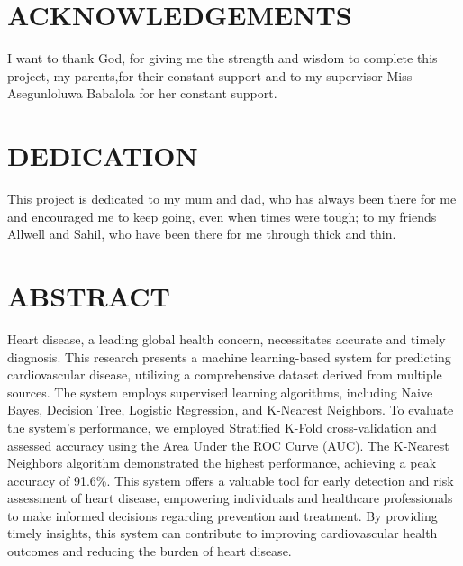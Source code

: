 \documentclass[12pt,paper=a4,oneside,cleardoubleage=plain,final]{report}
\begin{document}

\chapter*{ACKNOWLEDGEMENTS}
\noindent
I want to thank God, for giving me the strength and wisdom to complete this project, my parents,for their constant support and to my supervisor Miss Asegunloluwa Babalola for her constant support.

\chapter*{DEDICATION}
\noindent
This project is dedicated to my mum and dad, who has always been there for me and encouraged me to keep going, even when times were tough; to my friends Allwell and Sahil, who have been there for me through thick and thin.


\chapter*{ABSTRACT}
\noindent
Heart disease, a leading global health concern, necessitates accurate and timely diagnosis. This research presents a machine learning-based system for predicting cardiovascular disease, utilizing a comprehensive dataset derived from multiple sources. The system employs supervised learning algorithms, including Naive Bayes, Decision Tree, Logistic Regression, and K-Nearest Neighbors. To evaluate the system's performance, we employed Stratified K-Fold cross-validation and assessed accuracy using the Area Under the ROC Curve (AUC). The K-Nearest Neighbors algorithm demonstrated the highest performance, achieving a peak accuracy of 91.6\%. This system offers a valuable tool for early detection and risk assessment of heart disease, empowering individuals and healthcare professionals to make informed decisions regarding prevention and treatment. By providing timely insights, this system can contribute to improving cardiovascular health outcomes and reducing the burden of heart disease.


{
	\onehalfspacing
	\renewcommand{\contentsname}{Table of Contents}
	\tableofcontents
	\listoffigures
}



\end{document}

